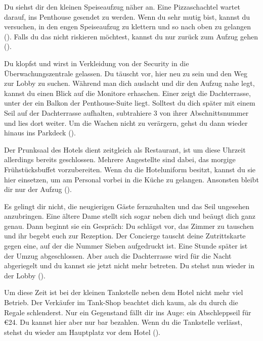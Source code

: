 {	%
	Du siehst dir den kleinen Speiseaufzug näher an. Eine Pizzaschachtel wartet darauf, ins Penthouse gesendet zu werden. Wenn du sehr mutig bist, kannst du versuchen, in den engen Speiseaufzug zu klettern und so nach oben zu gelangen (). Falls du das nicht riskieren möchtest, kannst du nur zurück zum Aufzug gehen ().

	Du klopfst und wirst in Verkleidung von der Security in die Überwachungszentrale gelassen. Du täuscht vor, hier neu zu sein und den Weg zur Lobby zu suchen. Während man dich auslacht und dir den Aufzug nahe legt, kannst du einen Blick auf die Monitore erhaschen. Einer zeigt die Dachterrasse, unter der ein Balkon der Penthouse-Suite liegt. Solltest du dich später mit einem Seil auf der Dachterrasse aufhalten, subtrahiere 3 von ihrer Abschnittsnummer und lies dort weiter. Um die Wachen nicht zu verärgern, gehst du dann wieder hinaus ins Parkdeck ().

	Der Prunksaal des Hotels dient zeitgleich als Restaurant, ist um diese Uhrzeit allerdings bereits geschlossen. Mehrere Angestellte sind dabei, das morgige Frühstücksbuffet vorzubereiten. Wenn du die Hoteluniform besitzt, kannst du sie hier einsetzen, um am Personal vorbei in die Küche zu gelangen. Ansonsten bleibt dir nur der Aufzug ().

	Es gelingt dir nicht, die neugierigen Gäste fernzuhalten und das Seil ungesehen anzubringen. Eine ältere Dame stellt sich sogar neben dich und beäugt dich ganz genau. Dann beginnt sie ein Gespräch:  Du schlägst vor, das Zimmer zu tauschen und ihr begebt euch zur Rezeption. Der Concierge tauscht deine Zutrittskarte gegen eine, auf der die Nummer Sieben aufgedruckt ist. Eine Stunde später ist der Umzug abgeschlossen. Aber auch die Dachterrasse wird für die Nacht abgeriegelt und du kannst sie jetzt nicht mehr betreten. Du stehst nun wieder in der Lobby ().

	Um diese Zeit ist bei der kleinen Tankstelle neben dem Hotel nicht mehr viel Betrieb. Der Verkäufer im Tank-Shop beachtet dich kaum, als du durch die Regale schlenderst. Nur ein Gegenstand fällt dir ins Auge: ein Abschleppseil für €24. Du kannst hier aber nur bar bezahlen. Wenn du die Tankstelle verlässt, stehst du wieder am Hauptplatz vor dem Hotel ().

}

